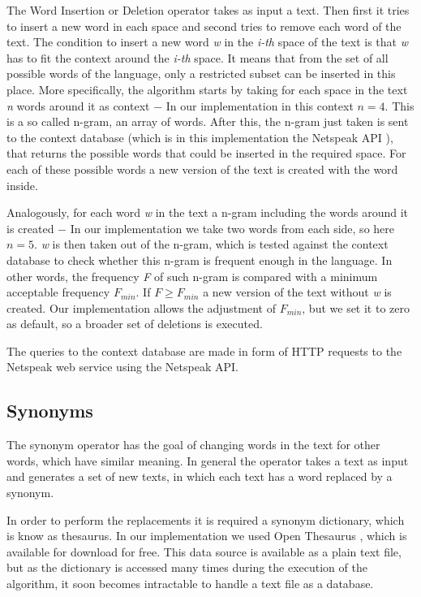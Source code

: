 \documentclass[11pt]{reportAlternative}
\begin{document}
The Word Insertion or Deletion operator takes as input a text. Then first it tries to insert a new word in each space and second tries to remove each word of the text. The condition to insert a new word \emph{w} in the \emph{i-th} space of the text is that \emph{w} has to fit the context around the \emph{i-th} space. It means that from the set of all possible words of the language, only a restricted subset can be inserted in this place. More specifically, the algorithm starts by taking for each space in the text \emph{n} words around it as context $-$ In our implementation in this context $n = 4$. This is a so called n-gram, an array of words. After this, the n-gram just taken is sent to the context database (which is in this implementation the Netspeak API \cite{Netspeak}), that returns the possible words that could be inserted in the required space. For each of these possible words a new version of the text is created with the word inside. \par

Analogously, for each word \emph{w} in the text a n-gram including the words around it is created $-$ In our implementation we take two words from each side, so here $n=5$. \emph{w} is then taken out of the n-gram, which is tested against the context database to check whether this n-gram is frequent enough in the language. In other words, the frequency \emph{F} of such n-gram is compared with a minimum acceptable frequency $F_{min}$. If $F \ge F_{min}$ a new version of the text without \emph{w} is created. Our implementation allows the adjustment of $F_{min}$, but we set it to zero as default, so a broader set of deletions is executed. \par

The queries to the context database are made in form of HTTP requests to the Netspeak web service using the Netspeak API. \par

\subsection{Synonyms}
The synonym operator has the goal of changing words in the text for other words, which have similar meaning. In general the operator takes a text as input and generates a set of new texts, in which each text has a word replaced by a synonym.

In order to perform the replacements it is required a synonym dictionary, which is know as thesaurus. In our implementation we used Open Thesaurus \cite{OpenThesuarus}, which is available for download for free. This data source is available as a plain text file, but as the dictionary is accessed many times during the execution of the algorithm, it soon becomes intractable to handle a text file as a database.
\end{document}
